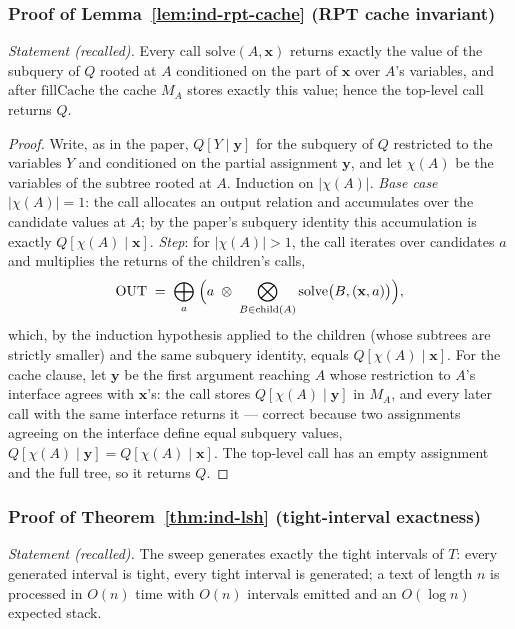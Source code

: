 \subsubsection*{Proof of Lemma~\ref{lem:ind-rpt-cache} (RPT cache invariant)}
{\itshape Statement (recalled).} Every call $\mathrm{solve}(A,\mathbf{x})$ returns
exactly the value of the subquery of $Q$ rooted at $A$ conditioned on the part of
$\mathbf{x}$ over $A$'s variables, and after $\mathrm{fillCache}$ the cache $M_A$
stores exactly this value; hence the top-level call returns $Q$.\eop

\begin{proof}
Write, as in the paper, $Q[Y \mid \mathbf{y}]$ for the subquery of $Q$ restricted to
the variables $Y$ and conditioned on the partial assignment $\mathbf{y}$, and let
$\chi(A)$ be the variables of the subtree rooted at $A$. Induction on
$|\chi(A)|$. \emph{Base case} $|\chi(A)| = 1$: the call allocates an output relation
and accumulates over the candidate values at $A$; by the paper's subquery identity
this accumulation is exactly $Q[\chi(A) \mid \mathbf{x}]$. \emph{Step}: for
$|\chi(A)| > 1$, the call iterates over candidates $a$ and multiplies the returns of
the children's calls,
\[
\mathrm{OUT} \;=\; \bigoplus_{a}\;
\Bigl( a \;\otimes\; \bigotimes_{B \in \mathrm{child}(A)}
\mathrm{solve}\bigl(B, (\mathbf{x},a)\bigr) \Bigr),
\]
which, by the induction hypothesis applied to the children (whose subtrees are
strictly smaller) and the same subquery identity, equals
$Q[\chi(A) \mid \mathbf{x}]$. For the cache clause, let $\mathbf{y}$ be the first
argument reaching $A$ whose restriction to $A$'s interface agrees with
$\mathbf{x}$'s: the call stores $Q[\chi(A) \mid \mathbf{y}]$ in $M_A$, and every later
call with the same interface returns it --- correct because two assignments agreeing
on the interface define equal subquery values,
$Q[\chi(A) \mid \mathbf{y}] = Q[\chi(A) \mid \mathbf{x}]$. The top-level call has an
empty assignment and the full tree, so it returns $Q$.
\end{proof}

\subsubsection*{Proof of Theorem~\ref{thm:ind-lsh} (tight-interval exactness)}
{\itshape Statement (recalled).} The sweep generates exactly the tight intervals of
$T$: every generated interval is tight, every tight interval is generated; a text of
length $n$ is processed in $O(n)$ time with $O(n)$ intervals emitted and an
$O(\log n)$ expected stack.\eop

